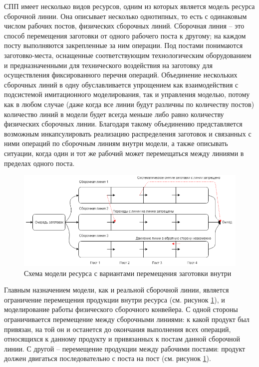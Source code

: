 \indent СПП имеет несколько видов ресурсов, одним из которых является модель ресурса сборочной линии.
Она описывает несколько однотипных, то есть с одинаковым числом рабочих постов, физических сборочных линий.
Сборочная линия -- это способ перемещения заготовки от одного рабочего поста к другому; на каждом посту выполняются закрепленные за ним операции.
Под постами понимаются заготовко-места, оснащенные соответствующим технологическим оборудованием и предназначенными для технического воздействия на заготовку для осуществления фиксированного перечня операций.
Объединение нескольких сборочных линий в одну обуславливается упрощением как взаимодействия с подсистемой имитационного моделирования, так и управления моделью, потому как в любом случае (даже когда все линии будут различны по количеству постов) количество линий в модели будет всегда меньше либо равно количеству физических сборочных линии.
Благодаря такому объединению представляется возможным инкапсулировать реализацию распределения заготовок и связанных с ними операций по сборочным линиям внутри модели, а также описывать ситуации, когда один и тот же рабочий может перемещаться между линиями в пределах одного поста.

\begin{figure}[ht]	
	\centering	
	\includegraphics[width=\linewidth]{pics/assemblyMain.png}
	\caption{Схема модели ресурса с вариантами перемещения заготовки внутри}
	\label{fig:assemblyMain}
\end{figure}

\indent Главным назначением модели, как и реальной сборочной линии, является ограничение перемещения продукции внутри ресурса (см. рисунок \ref{fig:assemblyMain}), и моделирование работы физического сборочного конвейера.
С одной стороны ограничивается перемещение между сборочными линиями: к какой продукт был привязан, на той он и останется до окончания выполнения всех операций, относящихся к данному продукту и привязанных к постам данной сборочной линии.
С другой -- перемещение продукции между рабочими постами: продукт должен двигаться последовательно с поста на пост (см. рисунок \ref{fig:assemblyMain}).\\

